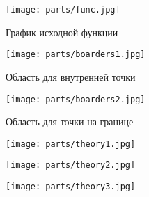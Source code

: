 \documentclass[../body.tex]{subfiles}
\begin{document}
\begin{figure}[H]
    \centering
    \texttt{[image: parts/func.jpg]}
    \caption{График исходной функции}
\end{figure}
\begin{figure}[H]
    \centering
    \texttt{[image: parts/boarders1.jpg]}
    \caption{Область для внутренней точки}
\end{figure}
\begin{figure}[H]
    \centering
    \texttt{[image: parts/boarders2.jpg]}
    \caption{Область для точки на границе}
\end{figure}

\begin{figure}[H]
    \centering
    \texttt{[image: parts/theory1.jpg]}
\end{figure}
\begin{figure}[H]
    \centering
    \texttt{[image: parts/theory2.jpg]}
\end{figure}
\begin{figure}[H]
    \centering
    \texttt{[image: parts/theory3.jpg]}
\end{figure}
\end{document}
